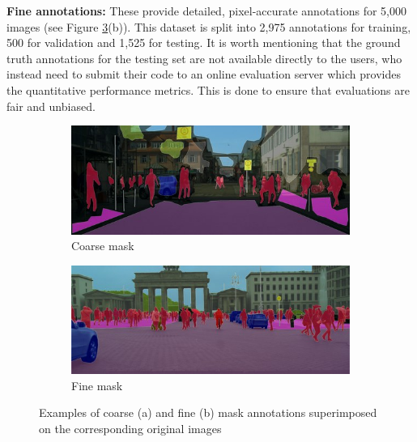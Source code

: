 \textbf{Fine annotations:} These provide detailed, pixel-accurate annotations for 5,000 images (see Figure \ref{fig:cityscapes}(b)). This dataset is split into 2,975 annotations for training, 500 for validation and 1,525 for testing. It is worth mentioning that the ground truth annotations for the testing set are not available directly to the users, who instead need to submit their code to an online evaluation server which provides the quantitative performance metrics. This is done to ensure that evaluations are fair and unbiased.

\begin{figure}[ht]
    \centering
    \begin{subfigure}{0.45\textwidth}
        \centering
        \includegraphics[width=\linewidth]{coarse_example.jpg}
        \caption{Coarse mask}
        \label{fig:sub1}
    \end{subfigure}\hfill
    \begin{subfigure}{0.45\textwidth}
        \centering
        \includegraphics[width=\linewidth]{fine_example.jpg}
        \caption{Fine mask}
        \label{fig:sub2}
    \end{subfigure}
    \caption{Examples of coarse (a) and fine (b) mask annotations superimposed on the corresponding original images}
    \label{fig:cityscapes}
\end{figure}

